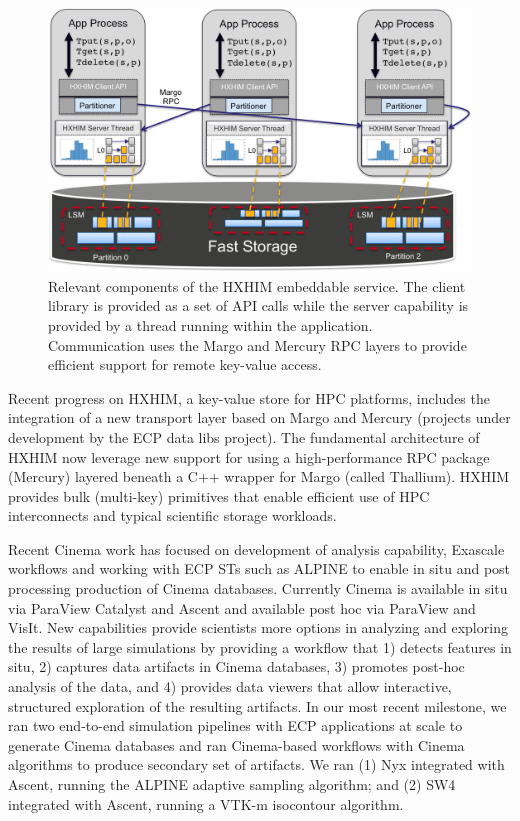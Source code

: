 \begin{figure}[htb]
	\centering
	\includegraphics[width=6in]{projects/2.3.6-NNSA/2.3.6.01-LANL-ATDM/hxhim-main}
	\caption{\label{fig:hxhim} Relevant components of the HXHIM
	embeddable service. The client library is provided as a set of API
	calls while the server capability is provided by a thread running
	within the application. Communication uses the Margo and Mercury RPC
	layers to provide efficient support for remote key-value access.}
\end{figure}

Recent progress on HXHIM, a key-value store for HPC platforms, includes the
integration of a new transport layer based on Margo and Mercury (projects
under development by the ECP data libs project). The fundamental architecture
of HXHIM now leverage new support for using a high-performance RPC package
(Mercury) layered beneath a C++ wrapper for Margo (called Thallium). HXHIM
provides bulk (multi-key) primitives that enable efficient use of HPC
interconnects and typical scientific storage workloads.


Recent Cinema work has focused on development of analysis capability, Exascale workflows and working with ECP STs such as ALPINE to enable in situ and post processing production of Cinema databases.  Currently Cinema is available in situ via ParaView Catalyst and Ascent and available post hoc via ParaView and VisIt.   New capabilities provide scientists more options in analyzing and exploring the results of large simulations by providing a workflow that 1) detects features in situ, 2) captures data artifacts in Cinema databases, 3) promotes post-hoc analysis of the data, and 4) provides data viewers that allow interactive, structured exploration of the resulting artifacts. 
%
In our most recent milestone, we ran two end-to-end simulation pipelines with ECP applications at scale to generate Cinema databases and ran Cinema-based workflows with Cinema algorithms to produce secondary set of artifacts.  We ran (1) Nyx integrated with Ascent, running the ALPINE adaptive sampling algorithm; and (2) SW4 integrated with Ascent, running a VTK-m isocontour algorithm.  

